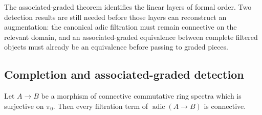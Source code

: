 The associated-graded theorem identifies the linear layers of formal order. Two
detection results are still needed before those layers can reconstruct an augmentation:
the canonical adic filtration must remain connective on the relevant domain, and an
associated-graded equivalence between complete filtered objects must already be an
equivalence before passing to graded pieces.

\subsection{Completion and associated-graded detection}


\begin{lemma}
\label{lem:adic-filtration-connective}
Let \(A\to B\) be a morphism of connective commutative ring spectra which is
surjective on \(\pi_0\). Then every filtration term of
\(\operatorname{adic}(A\to B)\) is connective.
\end{lemma}

